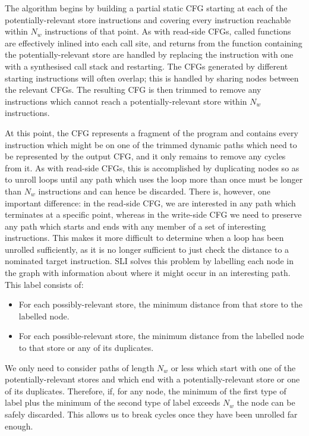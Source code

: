 The algorithm begins by building a partial static CFG starting at each of the potentially-relevant store instructions and covering every instruction reachable within $N_w$ instructions of that point.
As with read-side CFGs, called functions are effectively inlined into each call site, and returns from the function containing the potentially-relevant store are handled by replacing the instruction with one with a synthesised call stack and restarting.
The CFGs generated by different starting instructions will often overlap; this is handled by sharing nodes between the relevant CFGs.
The resulting CFG is then trimmed to remove any instructions which cannot reach a potentially-relevant store within $N_w$ instructions.

At this point, the CFG represents a fragment of the program and contains every instruction which might be on one of the trimmed dynamic paths which need to be represented by the output CFG, and it only remains to remove any cycles from it.
As with read-side CFGs, this is accomplished by duplicating nodes so as to unroll loops until any path which uses the loop more than once must be longer than $N_w$ instructions and can hence be discarded.
There is, however, one important difference: in the read-side CFG, we are interested in any path which terminates at a specific point, whereas in the write-side CFG we need to preserve any path which starts and ends with any member of a set of interesting instructions.
This makes it more difficult to determine when a loop has been unrolled sufficiently, as it is no longer sufficient to just check the distance to a nominated target instruction.
SLI solves this problem by labelling each node in the graph with information about where it might occur in an interesting path.
This label consists of:

\begin{itemize}
\item
  For each possibly-relevant store, the minimum distance from that store to the labelled node.
\item
  For each possible-relevant store, the minimum distance from the labelled node to that store or any of its duplicates.
\end{itemize}

We only need to consider paths of length $N_w$ or less which start with one of the potentially-relevant stores and which end with a potentially-relevant store or one of its duplicates.
Therefore, if, for any node, the minimum of the first type of label plus the minimum of the second type of label exceeds $N_w$ the node can be safely discarded.
This allows us to break cycles once they have been unrolled far enough.

